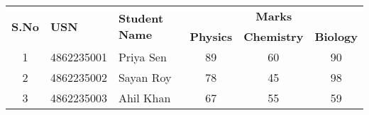 \documentclass{article}
\begin{document}
\begin{table}[ht]
\centering
\begin{tabular}{|c|p{3cm}|p{3.5cm}|c|c|c|}
\hline
\multirow{2}{*}{\textbf{S.No}} & \multirow{2}{*}{\textbf{USN}} & \multirow{2}{*}{\textbf{Student Name}} & \multicolumn{3}{c|}{\textbf{Marks}} \\
\cline{4-6}
 &  &  & \textbf{Physics} & \textbf{Chemistry} & \textbf{Biology} \\
\hline
1 & 4862235001 & Priya Sen & 89 & 60 & 90 \\
2 & 4862235002 & Sayan Roy & 78 & 45 & 98 \\
3 & 4862235003 & Ahil Khan & 67 & 55 & 59 \\
\hline
\end{tabular}
\end{table}
\end{document}
